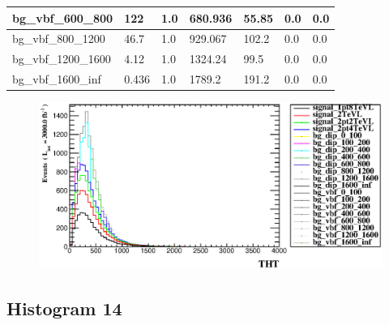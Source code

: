 \documentclass[a4paper, 10pt]{article}
\begin{document}
\begin{table}[H]
\begin{center}
\begin{tabular}{|m{23.0mm}|m{23.0mm}|m{18.0mm}|m{19.0mm}|m{19.0mm}|m{19.0mm}|m{19.0mm}|}
      \hline
      {\cellcolor{white}         bg\_vbf\_600\_800}& {\cellcolor{white}         122}& {\cellcolor{white}         1.0}& {\cellcolor{white}         680.936}& {\cellcolor{white}         55.85}& {\cellcolor{green}         0.0}& {\cellcolor{green}         0.0}\\
      \hline
      {\cellcolor{white}         bg\_vbf\_800\_1200}& {\cellcolor{white}         46.7}& {\cellcolor{white}         1.0}& {\cellcolor{white}         929.067}& {\cellcolor{white}         102.2}& {\cellcolor{green}         0.0}& {\cellcolor{green}         0.0}\\
      \hline
      {\cellcolor{white}         bg\_vbf\_1200\_1600}& {\cellcolor{white}         4.12}& {\cellcolor{white}         1.0}& {\cellcolor{white}         1324.24}& {\cellcolor{white}         99.5}& {\cellcolor{green}         0.0}& {\cellcolor{green}         0.0}\\
      \hline
      {\cellcolor{white}         bg\_vbf\_1600\_inf}& {\cellcolor{white}         0.436}& {\cellcolor{white}         1.0}& {\cellcolor{white}         1789.2}& {\cellcolor{white}         191.2}& {\cellcolor{green}         0.0}& {\cellcolor{green}         0.0}\\
\hline
    \end{tabular}
  \end{center}
\end{table}

\begin{figure}[H]
  \begin{center}
    \includegraphics[scale=0.45]{selection_12.eps}\\
\caption{   }
  \end{center}
\end{figure}
      \newpage
\subsection{ Histogram 14}
\end{document}
